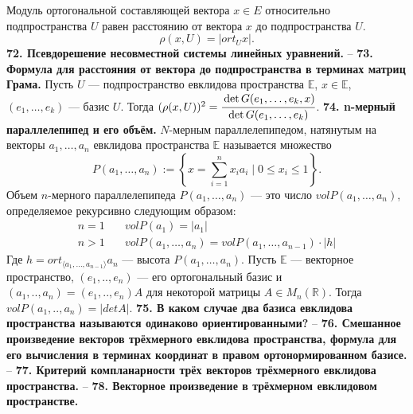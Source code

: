 \documentclass{article}
\begin{document}
Модуль ортогональной составляющей вектора $x \in E$ относительно подпространства $U$ равен расстоянию от вектора $x$ до подпространства $U$.
$$
\rho (x,U) = |ort_U x|.
$$
\newline
\newline
\textbf{72. Псевдорешение несовместной системы линейных уравнений.}
--
\newline
\newline
\textbf{73. Формула для расстояния от вектора до подпространства в терминах матриц Грама.}
Пусть $U$ --- подпространство евклидова пространства $\mathbb{E}$, $x \in \mathbb{E}$, $(e_1, \ldots, e_k)$ --- базис $U$. Тогда 
$(\rho(x,U))^2 = \cfrac{\det G(e_1, \ldots, e_k, x)}{\det G(e_1, \ldots, e_k)}$.
\newline
\newline
\textbf{74. n-мерный параллелепипед и его объём.}
$N$-мерным параллелепипедом, натянутым на векторы $a_1, \ldots, a_n$ евклидова пространства $\mathbb{E}$ называется множество 
$$
P(a_1, \ldots, a_n) := \left\{ x = \sum_{i = 1}^n x_ia_i \mid 0 \leqslant x_i \leqslant 1 \right\}.
$$  
Объем $n$-мерного параллелепипеда $P(a_1, \ldots, a_{n})$ --- это число $vol P(a_1, \ldots, a_{n})$, определяемое рекурсивно следующим образом:
\begin{align*}
n = 1 \quad& vol P(a_1) = |a_1| \\
n > 1 \quad& vol P(a_1, \ldots, a_n) = vol P(a_1, \ldots, a_{n-1})\cdot |h|
\end{align*}
Где $h = ort_{\langle a_1, \ldots, a_{n-1}\rangle}a_n$ --- высота $P(a_1, \ldots, a_n)$.
Пусть $\mathbb{E}$ --- векторное пространство, $(e_1,..,e_n)$ --- его ортогональный базис и $(a_1,..,a_n) = (e_1,..,e_n)A$ для некоторой матрицы $A \in M_n(\mathbb{R})$. Тогда $vol P(a_1,..,a_n) = |det A|$.
\newline
\newline
\textbf{75. В каком случае два базиса евклидова пространства называются одинаково ориентированными?}
--
\newline
\newline
\textbf{76. Смешанное произведение векторов трёхмерного евклидова пространства, формула для его вычисления в терминах координат в правом ортонормированном базисе.}
--
\newline
\newline
\textbf{77. Критерий компланарности трёх векторов трёхмерного евклидова пространства.}
--
\newline
\newline
\textbf{78. Векторное произведение в трёхмерном евклидовом пространстве.}
\end{document}
